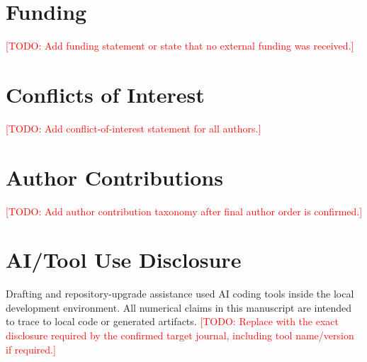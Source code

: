 \documentclass[11pt,a4paper]{article}
\newcommand{\TODO}[1]{\textcolor{red}{[TODO: #1]}}
\begin{document}
\section*{Funding}

\TODO{Add funding statement or state that no external funding was received.}

\section*{Conflicts of Interest}

\TODO{Add conflict-of-interest statement for all authors.}

\section*{Author Contributions}

\TODO{Add author contribution taxonomy after final author order is confirmed.}

\section*{AI/Tool Use Disclosure}

Drafting and repository-upgrade assistance used AI coding tools inside the local development environment. All numerical claims in this manuscript are intended to trace to local code or generated artifacts. \TODO{Replace with the exact disclosure required by the confirmed target journal, including tool name/version if required.}
\end{document}
